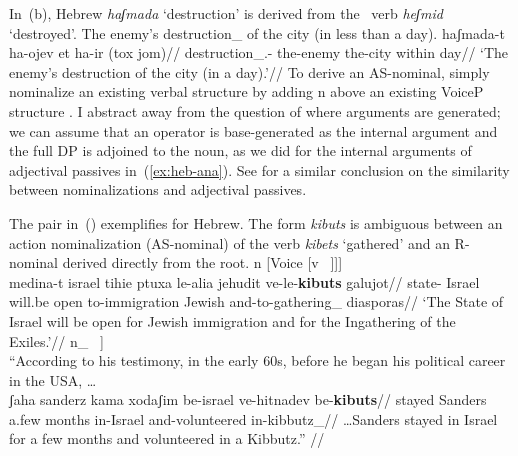 In~(\nextx b), Hebrew \emph{haʃmada} `destruction' is derived from the \thif~verb \emph{heʃmid} `destroyed'.
\pex\label{ex:nom-destruct}
	\a The enemy's destruction_{} of the city (in less than a day).
	\a \begingl
		\gla haʃmada-t ha-ojev et ha-ir (tox jom)//
		\glb destruction_{}.- the-enemy  the-city within day//
		\glft `The enemy's destruction of the city (in a day).'//
	\endgl
\xe
To derive an AS-nominal, simply nominalize an existing verbal structure by adding n above an existing VoiceP structure \citep{hazout95,engelhardt00}. I abstract away from the question of where arguments are generated; we can assume that an operator is base-generated as the internal argument and the full DP is adjoined to the noun, as we did for the internal arguments of adjectival passives in~(\ref{ex:heb-ana}). See \citet[559]{borer13oup} for a similar conclusion on the similarity between nominalizations and adjectival passives.
\\
\xe


The pair in~(\nextx) exemplifies for Hebrew. The form \emph{kibuts} is ambiguous between an action nominalization (AS-nominal) of the verb \emph{kibets} `gathered' and an R-nominal derived directly from the root.
\pex
	\a {[}n [Voice {\va} [v ~\!]]]\\
	\begingl
		\gla medina-t israel tihie ptuxa le-alia jehudit ve-le-\textbf{kibuts} galujot//
		\glb state- Israel will.be open to-immigration Jewish and-to-gathering_{} diasporas//
		\glft `The State of Israel will be open for Jewish immigration and for the Ingathering of the Exiles.'//
	\endgl
	\a {[}n_{} ~\!]\\
		``According to his testimony, in the early 60s, before he began his political career in the USA, \dots\\
	\begingl
		\gla ʃaha sanderz kama xodaʃim be-israel ve-hitnadev be-\textbf{kibuts}//
		\glb stayed Sanders a.few months in-Israel and-volunteered in-kibbutz_{}//
		\glft \dots Sanders stayed in Israel for a few months and volunteered in a Kibbutz.''	//
	\endgl
\xe

